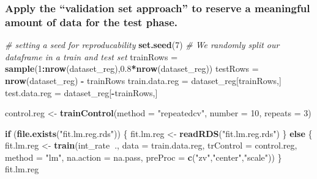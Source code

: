\documentclass[]{article}
\newenvironment{Shaded}{\begin{snugshade}}{\end{snugshade}}
\newcommand{\CommentTok}[1]{\textcolor[rgb]{0.56,0.35,0.01}{\textit{#1}}}
\newcommand{\ControlFlowTok}[1]{\textcolor[rgb]{0.13,0.29,0.53}{\textbf{#1}}}
\newcommand{\DataTypeTok}[1]{\textcolor[rgb]{0.13,0.29,0.53}{#1}}
\newcommand{\DecValTok}[1]{\textcolor[rgb]{0.00,0.00,0.81}{#1}}
\newcommand{\FloatTok}[1]{\textcolor[rgb]{0.00,0.00,0.81}{#1}}
\newcommand{\KeywordTok}[1]{\textcolor[rgb]{0.13,0.29,0.53}{\textbf{#1}}}
\newcommand{\NormalTok}[1]{#1}
\newcommand{\OperatorTok}[1]{\textcolor[rgb]{0.81,0.36,0.00}{\textbf{#1}}}
\newcommand{\StringTok}[1]{\textcolor[rgb]{0.31,0.60,0.02}{#1}}
\begin{document}
\hypertarget{apply-the-validation-set-approach-to-reserve-a-meaningful-amount-of-data-for-the-test-phase.}{%
\subsubsection{Apply the ``validation set approach'' to reserve a
meaningful amount of data for the test
phase.}\label{apply-the-validation-set-approach-to-reserve-a-meaningful-amount-of-data-for-the-test-phase.}}

\begin{Shaded}
\begin{Highlighting}[]
\CommentTok{# setting a seed for reproducability}
\KeywordTok{set.seed}\NormalTok{(}\DecValTok{7}\NormalTok{)}
\CommentTok{# We randomly split our dataframe in a train and test set}
\NormalTok{trainRows =}\StringTok{ }\KeywordTok{sample}\NormalTok{(}\DecValTok{1}\OperatorTok{:}\KeywordTok{nrow}\NormalTok{(dataset_reg),}\FloatTok{0.8}\OperatorTok{*}\KeywordTok{nrow}\NormalTok{(dataset_reg))}
\NormalTok{testRows =}\StringTok{ }\KeywordTok{nrow}\NormalTok{(dataset_reg) }\OperatorTok{-}\StringTok{ }\NormalTok{trainRows}
\NormalTok{train.data.reg =}\StringTok{ }\NormalTok{dataset_reg[trainRows,]}
\NormalTok{test.data.reg =}\StringTok{ }\NormalTok{dataset_reg[}\OperatorTok{-}\NormalTok{trainRows,]}
\end{Highlighting}
\end{Shaded}

\begin{Shaded}
\begin{Highlighting}[]
\NormalTok{control.reg <-}\StringTok{ }\KeywordTok{trainControl}\NormalTok{(}\DataTypeTok{method =} \StringTok{"repeatedcv"}\NormalTok{, }\DataTypeTok{number =} \DecValTok{10}\NormalTok{, }\DataTypeTok{repeats =} \DecValTok{3}\NormalTok{)}
\end{Highlighting}
\end{Shaded}

\begin{Shaded}
\begin{Highlighting}[]
\ControlFlowTok{if}\NormalTok{ (}\KeywordTok{file.exists}\NormalTok{(}\StringTok{"fit.lm.reg.rds"}\NormalTok{)) \{}
\NormalTok{   fit.lm.reg <-}\StringTok{ }\KeywordTok{readRDS}\NormalTok{(}\StringTok{"fit.lm.reg.rds"}\NormalTok{)}
\NormalTok{\} }\ControlFlowTok{else}\NormalTok{ \{}
\NormalTok{  fit.lm.reg <-}\StringTok{ }\KeywordTok{train}\NormalTok{(int_rate}\OperatorTok{~}\NormalTok{.,}
                      \DataTypeTok{data =}\NormalTok{ train.data.reg,}
                      \DataTypeTok{trControl =}\NormalTok{ control.reg,}
                      \DataTypeTok{method =} \StringTok{"lm"}\NormalTok{,}
                      \DataTypeTok{na.action =}\NormalTok{ na.pass,}
                      \DataTypeTok{preProc =} \KeywordTok{c}\NormalTok{(}\StringTok{"zv"}\NormalTok{,}\StringTok{"center"}\NormalTok{,}\StringTok{"scale"}\NormalTok{))  }
\NormalTok{\}}
\NormalTok{fit.lm.reg}
\end{Highlighting}
\end{Shaded}
\end{document}
